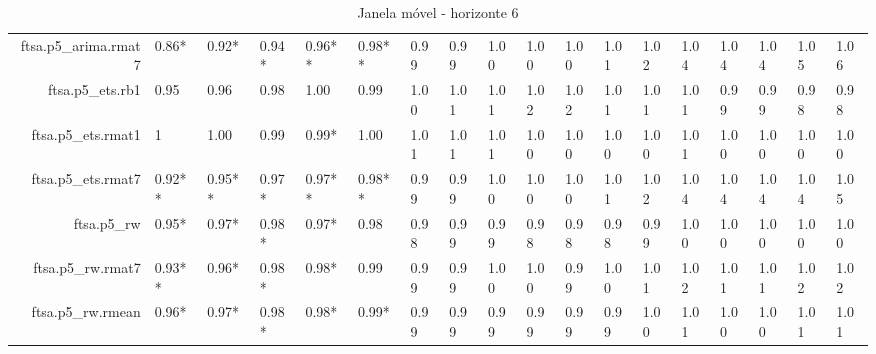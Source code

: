 \begin{table}[ht]
{\begin{tabular}{rlllllllllllllllll}
  ftsa.p5\_arima.rmat7 & 0.86* & 0.92* & 0.94* & 0.96** & 0.98** & 0.99 & 0.99 & 1.00 & 1.00 & 1.00 & 1.01 & 1.02 & 1.04 & 1.04 & 1.04 & 1.05 & 1.06 \\ 
  ftsa.p5\_ets.rb1 & 0.95 & 0.96 & 0.98 & 1.00 & 0.99 & 1.00 & 1.01 & 1.01 & 1.02 & 1.02 & 1.01 & 1.01 & 1.01 & 0.99 & 0.99 & 0.98 & 0.98 \\ 
  ftsa.p5\_ets.rmat1 & 1 & 1.00 & 0.99 & 0.99* & 1.00 & 1.01 & 1.01 & 1.01 & 1.00 & 1.00 & 1.00 & 1.00 & 1.01 & 1.00 & 1.00 & 1.00 & 1.00 \\ 
  ftsa.p5\_ets.rmat7 & 0.92** & 0.95** & 0.97* & 0.97** & 0.98** & 0.99 & 0.99 & 1.00 & 1.00 & 1.00 & 1.01 & 1.02 & 1.04 & 1.04 & 1.04 & 1.04 & 1.05 \\ 
  ftsa.p5\_rw & 0.95* & 0.97* & 0.98* & 0.97* & 0.98 & 0.98 & 0.99 & 0.99 & 0.98 & 0.98 & 0.98 & 0.99 & 1.00 & 1.00 & 1.00 & 1.00 & 1.00 \\ 
  ftsa.p5\_rw.rmat7 & 0.93** & 0.96* & 0.98* & 0.98* & 0.99 & 0.99 & 0.99 & 1.00 & 1.00 & 0.99 & 1.00 & 1.01 & 1.02 & 1.01 & 1.01 & 1.02 & 1.02 \\ 
  ftsa.p5\_rw.rmean & 0.96* & 0.97* & 0.98* & 0.98* & 0.99* & 0.99 & 0.99 & 0.99 & 0.99 & 0.99 & 0.99 & 1.00 & 1.01 & 1.00 & 1.00 & 1.01 & 1.01 \\ 
   \hline
\end{tabular}
}
\caption{Janela móvel - horizonte 6} 
\end{table}
